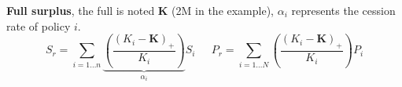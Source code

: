 \begin{f}
\textbf{Full surplus}, the full is noted \(\boldsymbol{K}\) (2M\EUR{} in the example), \(\alpha_i\) represents the cession rate of policy \(i\).
	\[
	S_r= \sum_{i=1\ldots n}\underbrace{\left(\frac{\left(K_i-\boldsymbol{K} \right)_+ }{K_i} \right)}_{\alpha_i} S_i\quad \ \ P_r=\sum_{i=1\ldots N}\left(\frac{\left(K_i-\boldsymbol{K} \right)_+ }{K_i} \right)P_i 
	\]



\end{f}
